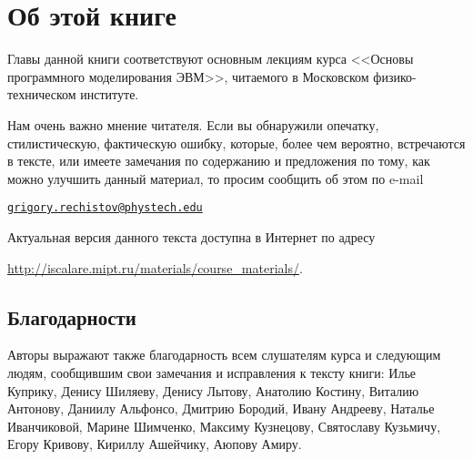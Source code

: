 \chapter*{Об этой книге}\label{chap:contrib}

Главы данной книги соответствуют основным лекциям курса <<Основы программного моделирования ЭВМ>>, читаемого в Московском физико-техническом институте.

Нам очень важно мнение читателя. Если вы обнаружили опечатку, стилистическую, фактическую ошибку, которые, более чем вероятно, встречаются в тексте, или имеете замечания по содержанию и предложения по тому, как можно улучшить данный материал, то просим сообщить об этом по e-mail 

\begin{center}
\href{mailto:grigory.rechistov@phystech.edu}{\texttt{grigory.rechistov@phystech.edu}}
\end{center}




Актуальная версия данного текста доступна в Интернет по адресу

\url{http://iscalare.mipt.ru/materials/course_materials/}.

\section*{Благодарности}

Авторы выражают также благодарность всем слушателям курса и следующим людям, сообщившим свои замечания и исправления к тексту книги: Илье Куприку, Денису Шиляеву, Денису Лытову, Анатолию Костину, Виталию Антонову, Даниилу Альфонсо, Дмитрию Бородий, Ивану Андрееву, Наталье Иванчиковой, Марине Шимченко, Максиму Кузнецову, Святославу Кузьмичу, Егору Кривову, Кириллу Ашейчику, Аюпову Амиру.


